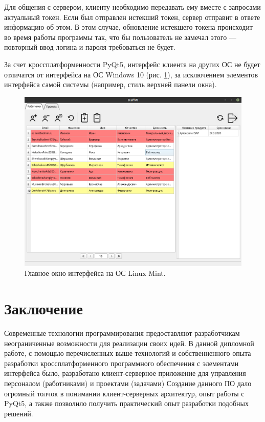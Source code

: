 Для общения с сервером, клиенту необходимо передавать ему вместе с запросами актуальный токен.
Если был отправлен истекший токен, сервер отправит в ответе информацию об этом.
В этом случае, обновление истекшего токена происходит во время работы программы так,
что бы пользователь не замечал этого --- повторный ввод логина и пароля требоваться не будет.

За счет кроссплатформенности PyQt5, интерфейс клиента на других ОС не будет отличатся от интерфейса на ОС Windows 10 (рис. \ref{fig:main_window_linux}),
за исключением элементов интерфейса самой системы (например, стиль верхней панели окна).
\begin{figure}[h]
    \centering
    \includegraphics[width=1\linewidth]{img/main_window_linux.png}
    \caption{Главное окно интерфейса на ОС Linux Mint.}
    \label{fig:main_window_linux}
\end{figure}


\clearpage
\section{Заключение}
Современные технологии программирования предоставляют разработчикам неограниченные возможности для реализации своих идей.
В данной дипломной работе, с помощью перечисленных выше технологий и собственненного опыта разработки кроссплатформенного программного обеспечения
с элементами интерфейса было, разработано клиент-серверное приложение для управления персоналом (работниками) и проектами (задачами)
Создание данного ПО дало огромный толчок в понимании клиент-серверных архитектур, опыт работы с PyQt5,
а также позволило получить практический опыт разработки подобных решений.


